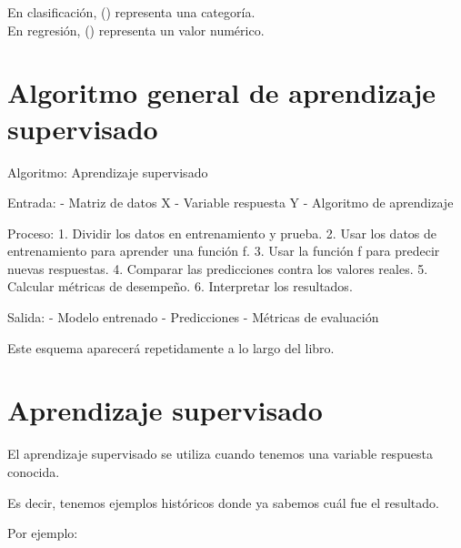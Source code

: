 \documentclass[
  11pt,
  letterpaper,
]{book}
\newenvironment{Shaded}{\begin{snugshade}}{\end{snugshade}}
\newcommand{\NormalTok}[1]{\textcolor[rgb]{0.00,0.23,0.31}{#1}}
\begin{document}
En clasificación, () representa una categoría.\\
En regresión, () representa un valor numérico.

\section{Algoritmo general de aprendizaje
supervisado}\label{algoritmo-general-de-aprendizaje-supervisado}

\begin{Shaded}
\begin{Highlighting}[]
\NormalTok{Algoritmo: Aprendizaje supervisado}

\NormalTok{Entrada:}
\NormalTok{  {-} Matriz de datos X}
\NormalTok{  {-} Variable respuesta Y}
\NormalTok{  {-} Algoritmo de aprendizaje}

\NormalTok{Proceso:}
\NormalTok{  1. Dividir los datos en entrenamiento y prueba.}
\NormalTok{  2. Usar los datos de entrenamiento para aprender una función f.}
\NormalTok{  3. Usar la función f para predecir nuevas respuestas.}
\NormalTok{  4. Comparar las predicciones contra los valores reales.}
\NormalTok{  5. Calcular métricas de desempeño.}
\NormalTok{  6. Interpretar los resultados.}

\NormalTok{Salida:}
\NormalTok{  {-} Modelo entrenado}
\NormalTok{  {-} Predicciones}
\NormalTok{  {-} Métricas de evaluación}
\end{Highlighting}
\end{Shaded}

Este esquema aparecerá repetidamente a lo largo del libro.

\section{Aprendizaje supervisado}\label{aprendizaje-supervisado}

El aprendizaje supervisado se utiliza cuando tenemos una variable
respuesta conocida.

Es decir, tenemos ejemplos históricos donde ya sabemos cuál fue el
resultado.

Por ejemplo:
\end{document}
